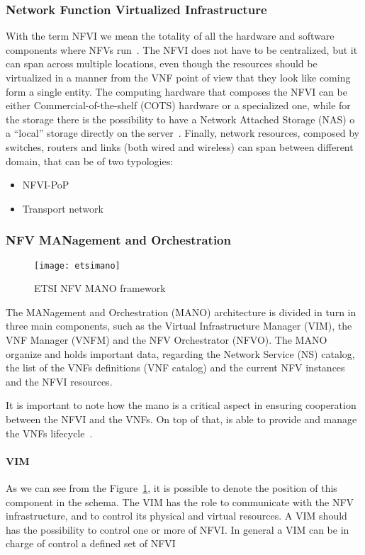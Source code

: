 \subsubsection{Network Function Virtualized Infrastructure}
With the term NFVI we mean the totality of all the hardware and software
components where NFVs run~\cite{etsi2013gs}. The NFVI does not have to be
centralized, but it can span across multiple locations, even though the
resources should be virtualized in a manner from the VNF point of view that they
look like coming form a single entity. The computing hardware that composes the
NFVI can be either Commercial-of-the-shelf (COTS) hardware or a specialized one,
while for the storage there is the possibility to have a Network Attached
Storage (NAS) o a ``local'' storage directly on the server~\cite{etsi2013gs}.
Finally, network resources, composed by switches, routers and links (both wired
and wireless) can span between different domain, that can be of two typologies:
\begin{itemize}
\item NFVI-PoP
\item Transport network
\end{itemize}

\subsubsection{NFV MANagement and Orchestration}

\begin{figure}[t]
  \centering
  \texttt{[image: etsimano]}
  \caption[ETSI NFV MANO framework]{ETSI NFV MANO
    framework~\cite{mijumbi2016management}}
  \label{chap:background:img:etsimano}
\end{figure}

The MANagement and Orchestration (MANO) architecture is divided in turn in three
main components, such as the Virtual Infrastructure Manager (VIM), the VNF
Manager (VNFM) and the NFV Orchestrator (NFVO). The MANO organize and holds
important data, regarding the Network Service (NS) catalog, the list of the VNFs
definitions (VNF catalog) and the current NFV instances and the NFVI resources.

It is important to note how the mano is a critical aspect in ensuring
cooperation between the NFVI and the VNFs. On top of that, is able to provide
and manage the VNFs lifecycle~\cite{mijumbi2016management}.

\paragraph{VIM}
As we can see from the Figure~\ref{chap:background:img:etsimano}, it is possible
to denote the position of this component in the schema. The VIM has the role to
communicate with the NFV infrastructure, and to control its physical and virtual
resources. A VIM should has the possibility to control one or more of NFVI. In
general a VIM can be in charge of control a defined set of
NFVI~\cite{mijumbi2016management}

